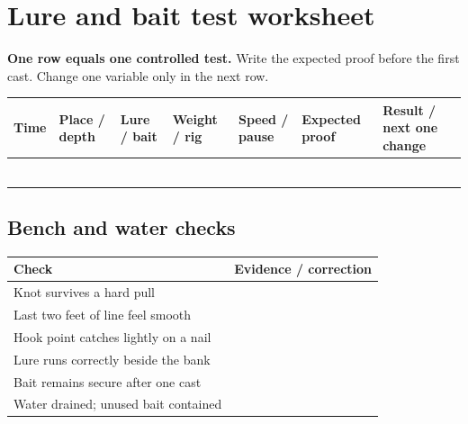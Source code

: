 \clearpage
\section*{Lure and bait test worksheet}
\textbf{One row equals one controlled test.} Write the expected proof before
the first cast. Change one variable only in the next row.

\scriptsize
\begin{tabularx}{\linewidth}{@{}p{.08\linewidth}p{.13\linewidth}p{.11\linewidth}
p{.12\linewidth}p{.12\linewidth}p{.12\linewidth}L@{}}
\toprule
Time & Place / depth & Lure / bait & Weight / rig & Speed / pause &
Expected proof & Result / next one change\\
\midrule
\rule{0pt}{3.8em}&&&&&&\\ \midrule
\rule{0pt}{3.8em}&&&&&&\\ \midrule
\rule{0pt}{3.8em}&&&&&&\\ \midrule
\rule{0pt}{3.8em}&&&&&&\\ \midrule
\rule{0pt}{3.8em}&&&&&&\\ \midrule
\rule{0pt}{3.8em}&&&&&&\\
\bottomrule
\end{tabularx}
\normalsize

\subsection*{Bench and water checks}
\begin{tabularx}{\linewidth}{@{}p{.31\linewidth}L@{}}
\toprule
Check & Evidence / correction\\
\midrule
Knot survives a hard pull & \rule{0pt}{2.8em}\dotfill\\
Last two feet of line feel smooth & \rule{0pt}{2.8em}\dotfill\\
Hook point catches lightly on a nail & \rule{0pt}{2.8em}\dotfill\\
Lure runs correctly beside the bank & \rule{0pt}{2.8em}\dotfill\\
Bait remains secure after one cast & \rule{0pt}{2.8em}\dotfill\\
Water drained; unused bait contained & \rule{0pt}{2.8em}\dotfill\\
\bottomrule
\end{tabularx}

